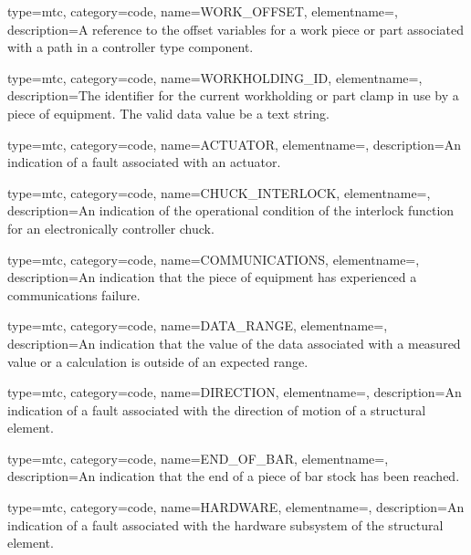 {
  type=mtc,
  category=code,
  name={WORK\_OFFSET},
  elementname=,
  description={A reference to the offset variables for a work piece or part associated with a \gls{path} in a \gls{controller} type component.}
}

{
  type=mtc,
  category=code,
  name={WORKHOLDING\_ID},
  elementname=,
  description={The identifier for the current workholding or part clamp in use by a piece of equipment. \newline The \gls{valid data value} \must be a text string.}
}


{
  type=mtc,
  category=code,
  name={ACTUATOR},
  elementname=,
  description={An indication of a fault associated with an actuator.}
}

{
  type=mtc,
  category=code,
  name={CHUCK\_INTERLOCK},
  elementname=,
  description={An indication of the operational condition of the interlock function for an electronically controller chuck.}
}

{
  type=mtc,
  category=code,
  name={COMMUNICATIONS},
  elementname=,
  description={An indication that the piece of equipment has experienced a communications failure.}
}

{
  type=mtc,
  category=code,
  name={DATA\_RANGE},
  elementname=,
  description={An indication that the value of the data associated with a measured value or a calculation is outside of an expected range.}
}

{
  type=mtc,
  category=code,
  name={DIRECTION},
  elementname=,
  description={An indication of a fault associated with the direction of motion of a \gls{structural element}.}
}

{
  type=mtc,
  category=code,
  name={END\_OF\_BAR},
  elementname=,
  description={An indication that the end of a piece of bar stock has been reached.}
}

{
  type=mtc,
  category=code,
  name={HARDWARE},
  elementname=,
  description={An indication of a fault associated with the hardware subsystem of the \gls{structural element}.}
}

